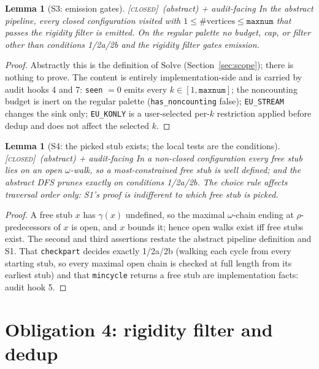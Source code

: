 \documentclass[11pt]{article}
\newtheorem{lemma}[theorem]{Lemma}
\theoremstyle{definition}
\newcommand{\CLOSED}{\textnormal{\textsc{[closed]}}}
\begin{document}
\begin{lemma}[S3: emission gates]\label{lem:S3} \CLOSED\ (abstract) + audit-facing\;
In the abstract pipeline, every closed configuration visited with
$1 \le \#\text{vertices} \le \texttt{maxnum}$ that passes the rigidity filter is emitted.
On the regular palette no budget, cap, or filter other than conditions 1/2a/2b and the
rigidity filter gates emission.
\end{lemma}

\begin{proof}
Abstractly this is the definition of $\mathrm{Solve}$
(Section~\ref{sec:scope}); there is nothing to prove. The content is entirely
implementation-side and is carried by audit hooks 4 and 7: \texttt{seen} $= 0$ emits
every $k \in [1, \texttt{maxnum}]$; the noncounting budget is inert on the regular
palette (\texttt{has\_noncounting} false); \texttt{EU\_STREAM} changes the sink only;
\texttt{EU\_KONLY} is a user-selected per-$k$ restriction applied before dedup and does
not affect the selected $k$.
\end{proof}

\begin{lemma}[S4: the picked stub exists; the local tests are the conditions]
\label{lem:S4} \CLOSED\ (abstract) + audit-facing\;
In a non-closed configuration every free stub lies on an open $\omega$-walk, so a
most-constrained free stub is well defined; and the abstract DFS prunes exactly on
conditions 1/2a/2b. The choice rule affects traversal order only: S1's proof is
indifferent to which free stub is picked.
\end{lemma}

\begin{proof}
A free stub $x$ has $\gamma(x)$ undefined, so the maximal $\omega$-chain ending at
$\rho$-predecessors of $x$ is open, and $x$ bounds it; hence open walks exist iff free
stubs exist. The second and third assertions restate the abstract pipeline definition
and S1. That \texttt{checkpart} decides exactly 1/2a/2b (walking each cycle from every
starting stub, so every maximal open chain is checked at full length from its earliest
stub) and that \texttt{mincycle} returns a free stub are implementation facts: audit
hook 5.
\end{proof}

\section{Obligation 4: rigidity filter and dedup}\label{sec:rigidity}
\end{document}

